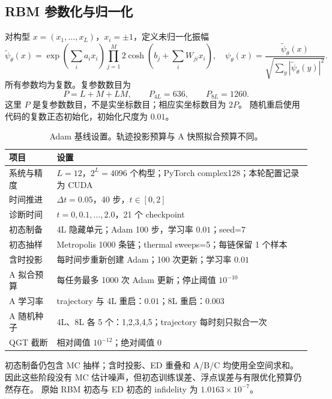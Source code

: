 \documentclass[UTF8,a4paper,11pt,fontset=fandol]{ctexart}
\begin{document}
\subsection{RBM 参数化与归一化}
对构型 $x=(x_1,\ldots,x_L)$，$x_i=\pm1$，定义未归一化振幅
\begin{equation}
\widetilde\psi_\theta(x)=
\exp\!\left(\sum_i a_i x_i\right)
\prod_{j=1}^{M}2\cosh\!\left(b_j+\sum_i W_{ji}x_i\right),
\quad
\psi_\theta(x)=\frac{\widetilde\psi_\theta(x)}{\sqrt{\sum_y|\widetilde\psi_\theta(y)|^2}}.
\end{equation}
所有参数均为复数。复参数数目为
\begin{equation}
P=L+M+LM,
\qquad P_{4L}=636,\qquad P_{8L}=1260.
\end{equation}
这里 $P$ 是复参数数目，不是实坐标数目；相应实坐标数目为 $2P$。
随机重启使用代码的复数正态初始化，初始化尺度为 $0.01$。

\begin{table}[htbp]
\centering\small
\caption{Adam 基线设置。轨迹投影预算与 A 快照拟合预算不同。}
\label{tab:settings}
\begin{tabularx}{\linewidth}{lX}
\toprule
项目 & 设置 \\
\midrule
系统与精度 & $L=12$，$2^L=4096$ 个构型；PyTorch complex128；本轮配置记录为 CUDA \\
时间推进 & $\Delta t=0.05$，40 步，$t\in[0,2]$ \\
诊断时间 & $t=0,0.1,\ldots,2.0$，21 个 checkpoint \\
初态制备 & 4L 隐藏单元；Adam 100 步，学习率 $0.01$；seed=7 \\
初态抽样 & Metropolis 1000 条链；thermal sweeps=5；每链保留 1 个样本 \\
含时投影 & 每时间步重新创建 Adam；100 次更新；学习率 $0.01$ \\
A 拟合预算 & 每任务最多 1000 次 Adam 更新；停止阈值 $10^{-10}$ \\
A 学习率 & trajectory 与 4L 重启：$0.01$；8L 重启：$0.003$ \\
A 随机种子 & 4L、8L 各 5 个：1,2,3,4,5；trajectory 每时刻只拟合一次 \\
QGT 截断 & 相对阈值 $10^{-12}$；绝对阈值 0 \\
\bottomrule
\end{tabularx}
\end{table}
初态制备仍包含 MC 抽样；含时投影、ED 重叠和 A/B/C 均使用全空间求和。
因此这些阶段没有 MC 估计噪声，但初态训练误差、浮点误差与有限优化预算仍然存在。
原始 RBM 初态与 ED 初态的 infidelity 为 $1.0163\times10^{-7}$。
\end{document}
